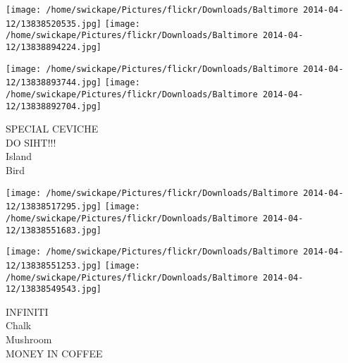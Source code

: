 \documentclass[10pt,letterpaper]{article}
\begin{document}
\texttt{[image: /home/swickape/Pictures/flickr/Downloads/Baltimore 2014-04-12/13838520535.jpg]}
\texttt{[image: /home/swickape/Pictures/flickr/Downloads/Baltimore 2014-04-12/13838894224.jpg]}

\texttt{[image: /home/swickape/Pictures/flickr/Downloads/Baltimore 2014-04-12/13838893744.jpg]}
\texttt{[image: /home/swickape/Pictures/flickr/Downloads/Baltimore 2014-04-12/13838892704.jpg]}

SPECIAL CEVICHE\\
DO SIHT!!!\\
Island\\
Bird
\pagebreak

\texttt{[image: /home/swickape/Pictures/flickr/Downloads/Baltimore 2014-04-12/13838517295.jpg]}
\texttt{[image: /home/swickape/Pictures/flickr/Downloads/Baltimore 2014-04-12/13838551683.jpg]}

\texttt{[image: /home/swickape/Pictures/flickr/Downloads/Baltimore 2014-04-12/13838551253.jpg]}
\texttt{[image: /home/swickape/Pictures/flickr/Downloads/Baltimore 2014-04-12/13838549543.jpg]}

INFINITI\\
Chalk\\
Mushroom\\
MONEY IN COFFEE
\pagebreak
\end{document}
